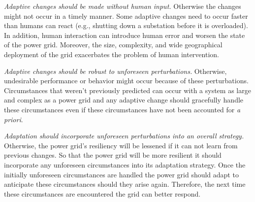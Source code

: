 \documentclass[conference]{IEEEtran}
\begin{document}
\emph{Adaptive changes should be made without human input.} Otherwise the changes might not occur in a timely manner. Some adaptive changes need to occur faster than humans can react (e.g., shutting down a substation before it is overloaded). In addition, human interaction can introduce human error and worsen the state of the power grid. Moreover, the size, complexity, and wide geographical deployment of the grid exacerbates the problem of human intervention.

\emph{Adaptive changes should be robust to unforeseen perturbations.} Otherwise, undesirable performance or behavior might occur because of these perturbations. Circumstances that weren't previously predicted can occur with a system as large and complex as a power grid and any adaptive change should gracefully handle these circumstances even if these circumstances have not been accounted for \emph{a priori}.

\emph{Adaptation should incorporate unforeseen perturbations into an overall strategy.}
Otherwise, the power grid's resiliency will be lessened if it can not learn from previous changes. So that the power grid will be more resilient it should incorporate any unforeseen circumstances into its adaptation strategy. Once the initially unforeseen circumstances are handled the power grid should adapt to anticipate these circumstances should they arise again. Therefore, the next time these circumstances are encountered the grid can better respond.
\end{document}
